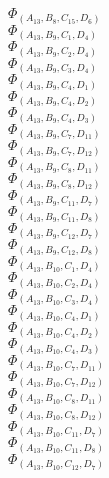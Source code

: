 \documentclass[14pt]{article}
\begin{document}
    $\Phi_{({A}_{13}, {B}_{8}, {C}_{15}, {D}_{6})}$ \\ 
    $\Phi_{({A}_{13}, {B}_{9}, {C}_{1}, {D}_{4})}$ \\ 
    $\Phi_{({A}_{13}, {B}_{9}, {C}_{2}, {D}_{4})}$ \\ 
    $\Phi_{({A}_{13}, {B}_{9}, {C}_{3}, {D}_{4})}$ \\ 
    $\Phi_{({A}_{13}, {B}_{9}, {C}_{4}, {D}_{1})}$ \\ 
    $\Phi_{({A}_{13}, {B}_{9}, {C}_{4}, {D}_{2})}$ \\ 
    $\Phi_{({A}_{13}, {B}_{9}, {C}_{4}, {D}_{3})}$ \\ 
    $\Phi_{({A}_{13}, {B}_{9}, {C}_{7}, {D}_{11})}$ \\ 
    $\Phi_{({A}_{13}, {B}_{9}, {C}_{7}, {D}_{12})}$ \\ 
    $\Phi_{({A}_{13}, {B}_{9}, {C}_{8}, {D}_{11})}$ \\ 
    $\Phi_{({A}_{13}, {B}_{9}, {C}_{8}, {D}_{12})}$ \\ 
    $\Phi_{({A}_{13}, {B}_{9}, {C}_{11}, {D}_{7})}$ \\ 
    $\Phi_{({A}_{13}, {B}_{9}, {C}_{11}, {D}_{8})}$ \\ 
    $\Phi_{({A}_{13}, {B}_{9}, {C}_{12}, {D}_{7})}$ \\ 
    $\Phi_{({A}_{13}, {B}_{9}, {C}_{12}, {D}_{8})}$ \\ 
    $\Phi_{({A}_{13}, {B}_{10}, {C}_{1}, {D}_{4})}$ \\ 
    $\Phi_{({A}_{13}, {B}_{10}, {C}_{2}, {D}_{4})}$ \\ 
    $\Phi_{({A}_{13}, {B}_{10}, {C}_{3}, {D}_{4})}$ \\ 
    $\Phi_{({A}_{13}, {B}_{10}, {C}_{4}, {D}_{1})}$ \\ 
    $\Phi_{({A}_{13}, {B}_{10}, {C}_{4}, {D}_{2})}$ \\ 
    $\Phi_{({A}_{13}, {B}_{10}, {C}_{4}, {D}_{3})}$ \\ 
    $\Phi_{({A}_{13}, {B}_{10}, {C}_{7}, {D}_{11})}$ \\ 
    $\Phi_{({A}_{13}, {B}_{10}, {C}_{7}, {D}_{12})}$ \\ 
    $\Phi_{({A}_{13}, {B}_{10}, {C}_{8}, {D}_{11})}$ \\ 
    $\Phi_{({A}_{13}, {B}_{10}, {C}_{8}, {D}_{12})}$ \\ 
    $\Phi_{({A}_{13}, {B}_{10}, {C}_{11}, {D}_{7})}$ \\ 
    $\Phi_{({A}_{13}, {B}_{10}, {C}_{11}, {D}_{8})}$ \\ 
    $\Phi_{({A}_{13}, {B}_{10}, {C}_{12}, {D}_{7})}$ \\ 
\end{document}
